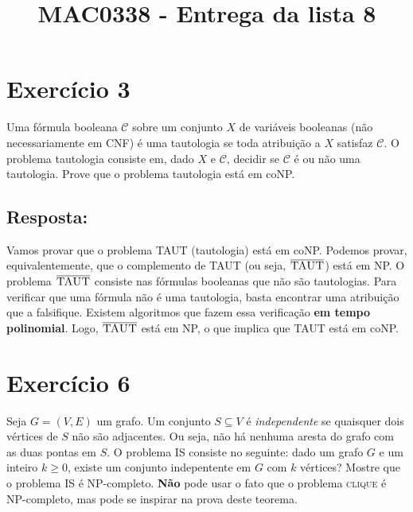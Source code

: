 \documentclass{article}
\title{MAC0338 - Entrega da lista 8}
\author{}
\date{}
\begin{document}
\maketitle

\section*{Exercício 3}
Uma fórmula booleana $\mathcal{C}$ sobre um conjunto $X$ de variáveis booleanas (não necessariamente em CNF) é uma tautologia se toda atribuição a $X$ satisfaz $\mathcal{C}$. O problema tautologia consiste em, dado $X$ e $\mathcal{C}$, decidir se $\mathcal{C}$ é ou não uma tautologia. Prove que o problema tautologia está em coNP.

\bigskip

\subsection*{Resposta:}
Vamos provar que o problema \textsc{TAUT} (tautologia) está em coNP.
Podemos provar, equivalentemente, que o complemento de \textsc{TAUT} (ou seja,  $\overline{\textsc{TAUT}}$) está em NP.
O problema $\overline{\textsc{TAUT}}$ consiste nas fórmulas booleanas que não são tautologias.
Para verificar que uma fórmula não é uma tautologia, basta encontrar uma atribuição que a falsifique. Existem algoritmos que fazem essa verificação \textbf{em tempo polinomial}.
Logo, $\overline{\textsc{TAUT}}$ está em NP, o que implica que \textsc{TAUT} está em coNP.

\newpage

\section*{Exercício 6}
Seja $G = (V,E)$ um grafo. Um conjunto $S \subseteq V$ é \textit{independente} se quaisquer dois vértices de $S$ não são adjacentes. Ou seja, não há nenhuma aresta do grafo com as duas pontas em $S$. O problema IS consiste no seguinte: dado um grafo $G$ e um inteiro $k\geq 0$, existe um conjunto indepentente em $G$ com $k$ vértices? Mostre que o problema IS é NP-completo. \textbf{Não} pode usar o fato que o problema \textsc{clique} é NP-completo, mas pode se inspirar na prova deste teorema.

\bigskip

\end{document}
